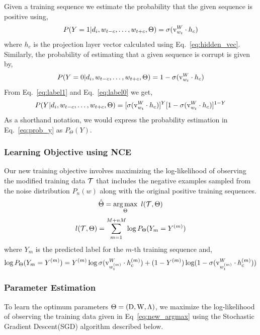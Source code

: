 Given a training sequence we estimate the probability that the given sequence is positive using,
\begin{equation}
\label{eq:label1}
P(Y=1|d_{i}, w_{t-c}, \ldots, w_{t+c}, \Theta) = \sigma(\mathrm{v}^{W}_{w_{t}} \cdot h_{c})
\end{equation}
where $h_{c}$ is the projection layer vector calculated using Eq.~\ref{eq:hidden_vec}. Similarly, the probability of estimating that a given sequence is corrupt is given by,
\begin{equation}
\label{eq:label0}
P(Y=0|d_{i}, w_{t-c}, \ldots, w_{t+c}, \Theta) = 1 - \sigma(\mathrm{v}^{W}_{w_{t}} \cdot h_{c})
\end{equation}
From Eq.~\ref{eq:label1} and Eq.~\ref{eq:label0} we get,
\begin{equation}
\label{eq:prob_y}
P(Y|d_{i}, w_{t-c}, \ldots, w_{t+c}, \Theta) = [\sigma(\mathrm{v}^{W}_{w_{t}} \cdot h_{c})]^{Y}[1 - \sigma(\mathrm{v}^{W}_{w_{t}} \cdot h_{c})]^{1-Y}
\end{equation}
As a shorthand notation, we would express the probability estimation in Eq.~\ref{eq:prob_y} as $P_{\Theta}(Y)$.

\subsubsection{Learning Objective using NCE}
Our new training objective involves maximizing the log-likelihood of observing the modified training data $\mathcal{T}$ that includes the negative examples sampled from the noise distribution $P_{n}(w)$ along with the original positive training sequences. 	
\begin{equation}
\label{eq:new_argmax}
\hat{\Theta} =  \operatorname*{arg\,max}_{\Theta}~l(\mathcal{T}, \Theta)
\end{equation}
\begin{equation}
\label{eq:new_training_objective}
l(\mathcal{T}, \Theta) = \sum_{m=1}^{M + nM} \log P_{\Theta}(Y_{m} = Y^{(m)})
\end{equation}
where $Y_{m}$ is the predicted label for the $m$-th training sequence and,
\begin{equation}
\label{eq:log_P}
\log P_{\Theta}(Y_{m} = Y^{(m)}) = Y^{(m)}\log \sigma(\mathrm{v}^{W}_{w^{(m)}_{t}} \cdot h^{(m)}_{c}) + (1 - Y^{(m)})\log (1 - \sigma(\mathrm{v}^{W}_{w^{(m)}_{t}} \cdot h^{(m)}_{c}))
\end{equation}

\subsubsection{Parameter Estimation}
\label{sec:para_esti_doc}
To learn the optimum parameters $\Theta = (\mathrm{D}, \mathrm{W}, \Lambda)$, we maximize the log-likelihood of observing the training data given in Eq~\ref{eq:new_argmax} using the Stochastic Gradient Descent(SGD) algorithm described below. 

